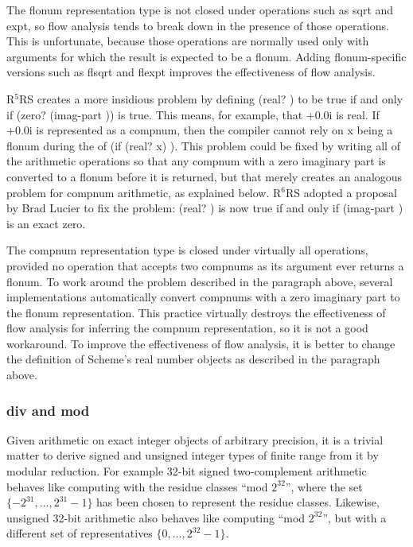 \documentclass[twoside,twocolumn]{algol60}
\newcommand{\rn}[1]{R$^{#1}$RS}
\begin{document}
The flonum representation type is not closed under operations such as
{\cf sqrt} and {\cf expt}, so flow analysis tends to break down in the
presence of those operations.  This is unfortunate, because those
operations are normally used only with arguments for which the result
is expected to be a flonum.  Adding flonum-specific versions such as
{\cf flsqrt} and {\cf flexpt} improves the effectiveness of flow
analysis.

\rn{5} creates a more insidious problem by defining {\cf (real?
  )} to be true if and only if {\cf (zero? (imag-part
  ))} is true.  This means, for example, that {+0.0i}
is real.  If {+0.0i} is represented as a compnum, then the
compiler cannot rely on x being a flonum during the 
of {\cf (if (real? x)  )}.  This
problem could be fixed by writing all of the arithmetic operations so
that any compnum with a zero imaginary part is converted to a flonum
before it is returned, but that merely creates an analogous problem
for compnum arithmetic, as explained below.  \rn{6} adopted a proposal
by Brad Lucier to fix the problem: {\cf (real? )} is now true
if and only if {\cf (imag-part )} is an exact zero.

The compnum representation type is closed under virtually all
operations, provided no operation that accepts two compnums as its
argument ever returns a flonum.  To work around the problem described
in the paragraph above, several implementations automatically convert
compnums with a zero imaginary part to the flonum representation.
This practice virtually destroys the effectiveness of flow analysis
for inferring the compnum representation, so it is not a good
workaround.  To improve the effectiveness of flow analysis, it is
better to change the definition of Scheme's real number objects as described
in the paragraph above.

\subsubsection{div and mod}

Given arithmetic on exact integer objects of arbitrary precision, it is a
trivial matter to derive signed and unsigned integer types of finite
range from it by modular reduction.  For example 32-bit signed
two-complement arithmetic behaves like computing with the residue
classes ``mod $2^{32}$'', where the set $\{-2^{31}, \ldots,
2^{31}-1\}$ has been chosen to represent the residue classes.
Likewise, unsigned 32-bit arithmetic also behaves like computing ``mod
$2^{32}$'', but with a different set of representatives $\{0, \ldots,
2^{32}-1\}$.
\end{document}
